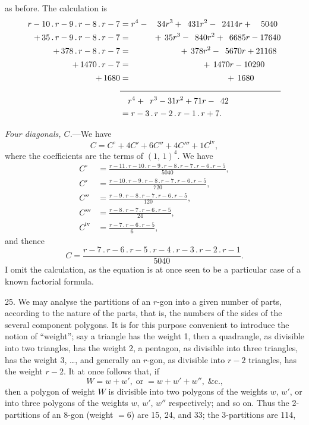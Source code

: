 \documentclass[11pt]{article}
\begin{document}
\smallskip
as before. The calculation is
\begin{align*}
r-10\,.\,r-9\,.\,r-8\,.\,r-7 &= r^{4}-\phantom{00}34r^{3}+\phantom{0}431r^{2}-\phantom{0}2414r+\phantom{00}5040\\
+\,35\,.\,r-9\,.\,r-8\,.\,r-7 &= \phantom{r^{4}-3}+\,35r^{3}-\phantom{0}840r^{2}+\phantom{0}6685r-17640\\
+\,378\,.\,r-8\,.\,r-7 &= \phantom{r^{4}-34r^{3}+1}+\,378r^{2}-\phantom{0}5670r+21168\\
+\,1470\,.\,r-7 &= \phantom{r^{4}-34r^{3}+431r^{2}+}+\,1470r-10290\\
+\,1680 &= \phantom{r^{4}-34r^{3}+431r^{2}-2414r}+\,1680\\[-2pt]
\cline{2-2}
&\phantom{=\,}r^{4}+\phantom{0}r^{3}-31r^{2}+71r-\phantom{0}42\\
&= r-3\,.\,r-2\,.\,r-1\,.\,r+7.
\end{align*}

\hspace{1em} \emph{Four diagonals, $C$.}---We have
\[
C=C^{\circ}+4C'+6C''+4C'''+1C^{\mathrm{iv}},
\]
where the coefficients are the terms of $(1,\,1)^{4}$. We have
\begin{align*}
C^{\circ} &= \frac{r-11\,.\,r-10\,.\,r-9\,.\,r-8\,.\,r-7\,.\,r-6\,.\,r-5}{5040},\\[4pt]
C' &= \frac{r-10\,.\,r-9\,.\,r-8\,.\,r-7\,.\,r-6\,.\,r-5}{720},\\[4pt]
C'' &= \frac{r-9\,.\,r-8\,.\,r-7\,.\,r-6\,.\,r-5}{120},\\[4pt]
C''' &= \frac{r-8\,.\,r-7\,.\,r-6\,.\,r-5}{24},\\[4pt]
C^{\mathrm{iv}} &= \frac{r-7\,.\,r-6\,.\,r-5}{6},
\end{align*}
and thence
\[
C=\frac{r-7\,.\,r-6\,.\,r-5\,.\,r-4\,.\,r-3\,.\,r-2\,.\,r-1}{5040}.
\]
I omit the calculation, as the equation is at once seen to be a particular
case of a known factorial formula.

\hspace{1em} 25. We may analyse the partitions of an $r$-gon into a given
number of parts, according to the nature of the parts, that is, the numbers
of the sides of the several component polygons. It is for this purpose
convenient to introduce the notion of ``weight''; say a triangle has the
weight 1, then a quadrangle, as divisible into two triangles, has the weight
2, a pentagon, as divisible into three triangles, has the weight 3, \ldots,
and generally an $r$-gon, as divisible into $r-2$ triangles, has the weight
$r-2$. It at once follows that, if
\[
W=w+w',\;\text{or}\;=w+w'+w'',\;\&\text{c.,}
\]
then a polygon of weight $W$ is divisible into two polygons of the weights
$w,\,w'$, or into three polygons of the weights $w,\,w',\,w''$ respectively;
and so on. Thus the 2-partitions of an 8-gon (weight $=6$) are 15, 24, and
33; the 3-partitions are 114,
\end{document}
